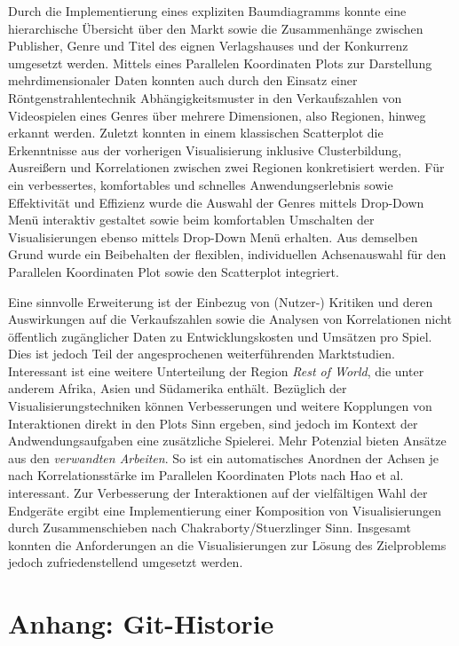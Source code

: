 \documentclass[usegeometry=true]{scrartcl}
\begin{document}
Durch die Implementierung eines expliziten Baumdiagramms konnte eine hierarchische Übersicht über den Markt sowie die Zusammenhänge zwischen Publisher, Genre und Titel des eignen Verlagshauses und der Konkurrenz umgesetzt werden.
Mittels eines Parallelen Koordinaten Plots zur Darstellung mehrdimensionaler Daten konnten auch durch den Einsatz einer Röntgenstrahlentechnik 
Abhängigkeitsmuster in den Verkaufszahlen von Videospielen eines Genres über mehrere Dimensionen, also Regionen, hinweg erkannt werden.
Zuletzt konnten in einem klassischen Scatterplot die Erkenntnisse aus der vorherigen Visualisierung inklusive Clusterbildung, 
Ausreißern und Korrelationen zwischen zwei Regionen konkretisiert werden. 
Für ein verbessertes, komfortables und schnelles Anwendungserlebnis sowie Effektivität und Effizienz wurde die Auswahl der Genres mittels Drop-Down Menü interaktiv gestaltet 
sowie beim komfortablen Umschalten der Visualisierungen ebenso mittels Drop-Down Menü erhalten.
Aus demselben Grund wurde ein Beibehalten der flexiblen, individuellen Achsenauswahl für den Parallelen Koordinaten Plot sowie den Scatterplot integriert.

Eine sinnvolle Erweiterung ist der Einbezug von (Nutzer-) Kritiken und deren Auswirkungen auf die Verkaufszahlen 
sowie die Analysen von Korrelationen nicht öffentlich zugänglicher Daten zu Entwicklungskosten und Umsätzen pro Spiel.
Dies ist jedoch Teil der angesprochenen weiterführenden Marktstudien.
Interessant ist eine weitere Unterteilung der Region \textit{Rest of World}, die unter anderem Afrika, Asien und Südamerika enthält.
Bezüglich der Visualisierungstechniken können Verbesserungen und weitere Kopplungen von Interaktionen direkt in den Plots Sinn ergeben, 
sind jedoch im Kontext der Andwendungsaufgaben eine zusätzliche Spielerei.
Mehr Potenzial bieten Ansätze aus den \textit{verwandten Arbeiten}. 
So ist ein automatisches Anordnen der Achsen je nach Korrelationsstärke im Parallelen Koordinaten Plots nach Hao et al. interessant.\cite{Hao.2007}
Zur Verbesserung der Interaktionen auf der vielfältigen Wahl der Endgeräte ergibt eine Implementierung einer Komposition von Visualisierungen durch Zusammenschieben nach Chakraborty/Stuerzlinger Sinn.\cite{Chakraborty.2021}
Insgesamt konnten die Anforderungen an die Visualisierungen zur Lösung des Zielproblems jedoch zufriedenstellend umgesetzt werden.
\newpage
\section*{Anhang: Git-Historie}

\printbibliography
\end{document}
